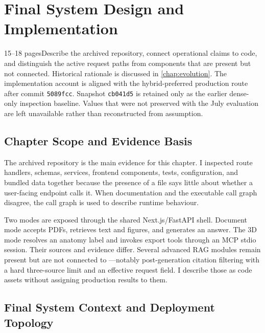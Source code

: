 \chapter{Final System Design and Implementation}
\label{chap:implementation}

\begin{chapterplan}{15--18 pages}{Describe the archived repository, connect operational claims to code, and distinguish the active request paths from components that are present but not connected. Historical rationale is discussed in \cref{chap:evolution}.}
The implementation account is aligned with the hybrid-preferred production route after commit \texttt{5089fcc}. Snapshot \texttt{cb041d5} is retained only as the earlier dense-only inspection baseline. Values that were not preserved with the July evaluation are left unavailable rather than reconstructed from assumption.
\end{chapterplan}

\section{Chapter Scope and Evidence Basis}
\label{sec:implementation-scope}

The archived repository is the main evidence for this chapter. I inspected route handlers, schemas, services, frontend components, tests, configuration, and bundled data together because the presence of a file says little about whether a user-facing endpoint calls it. When documentation and the executable call graph disagree, the call graph is used to describe runtime behaviour.

Two modes are exposed through the shared Next.js/FastAPI shell. Document mode accepts PDFs, retrieves text and figures, and generates an answer. The 3D mode resolves an anatomy label and invokes export tools through an MCP stdio session. Their sources and evidence differ. Several advanced RAG modules remain present but are not connected to ---notably post-generation citation filtering with a hard three-source limit and an effective  request field. I describe those as code assets without assigning production results to them.

\section{Final System Context and Deployment Topology}
\label{sec:final-system-context}

